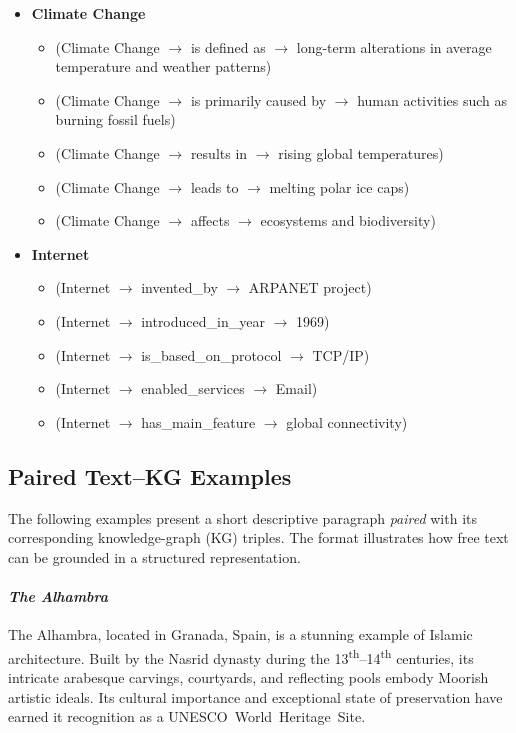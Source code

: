 \documentclass[11pt]{article}
\begin{document}
\begin{itemize}[leftmargin=*]
\item \textbf{Climate Change}
  \begin{itemize}[leftmargin=1em]
  \item (Climate Change $\rightarrow$ is defined as $\rightarrow$ long-term alterations in average temperature and weather patterns)
  \item (Climate Change $\rightarrow$ is primarily caused by $\rightarrow$ human activities such as burning fossil fuels)
  \item (Climate Change $\rightarrow$ results in $\rightarrow$ rising global temperatures)
  \item (Climate Change $\rightarrow$ leads to $\rightarrow$ melting polar ice caps)
  \item (Climate Change $\rightarrow$ affects $\rightarrow$ ecosystems and biodiversity)
  \end{itemize}

\item \textbf{Internet}
  \begin{itemize}[leftmargin=1em]
  \item (Internet $\rightarrow$ invented\_by $\rightarrow$ ARPANET project)
  \item (Internet $\rightarrow$ introduced\_in\_year $\rightarrow$ 1969)
  \item (Internet $\rightarrow$ is\_based\_on\_protocol $\rightarrow$ TCP/IP)
  \item (Internet $\rightarrow$ enabled\_services $\rightarrow$ Email)
  \item (Internet $\rightarrow$ has\_main\_feature $\rightarrow$ global connectivity)
  \end{itemize}
\end{itemize}

\subsection{Paired Text--KG Examples}
\label{sec:appendix-kgs2}

The following examples present a short descriptive paragraph \emph{paired} with its corresponding knowledge-graph (KG) triples.  The format illustrates how free text can be grounded in a structured representation.

\paragraph{\textit{The Alhambra}}
The Alhambra, located in Granada, Spain, is a stunning example of Islamic architecture.  Built by the Nasrid dynasty during the 13\textsuperscript{th}–14\textsuperscript{th} centuries, its intricate arabesque carvings, courtyards, and reflecting pools embody Moorish artistic ideals.  Its cultural importance and exceptional state of preservation have earned it recognition as a UNESCO~World~Heritage~Site.
\end{document}
